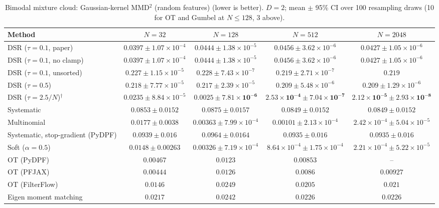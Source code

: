 \begin{table}[H]
\centering
\small
\caption{Bimodal mixture cloud: Gaussian-kernel MMD$^2$ (random features) (lower is better). $D{=}2$; mean $\pm$ 95\% CI over 100 resampling draws (10 for OT and Gumbel at $N\le128$, 3 above).}
\label{tab:static-mixture-rff_mmd2}
\begin{adjustbox}{max width=\linewidth}
\begin{tabular}{lcccc}
\toprule
Method & $N{=}32$ & $N{=}128$ & $N{=}512$ & $N{=}2048$ \\
\midrule
DSR ($\tau{=}0.1$, paper) & $0.0397\pm1.07\times10^{-4}$ & $0.0444\pm1.38\times10^{-5}$ & $0.0456\pm3.62\times10^{-6}$ & $0.0427\pm1.05\times10^{-6}$ \\
DSR ($\tau{=}0.1$, no clamp) & $0.0397\pm1.07\times10^{-4}$ & $0.0444\pm1.38\times10^{-5}$ & $0.0456\pm3.62\times10^{-6}$ & $0.0427\pm1.05\times10^{-6}$ \\
DSR ($\tau{=}0.1$, unsorted) & $0.227\pm1.15\times10^{-5}$ & $0.228\pm7.43\times10^{-7}$ & $0.219\pm2.71\times10^{-7}$ & $0.219$ \\
DSR ($\tau{=}0.5$) & $0.218\pm7.77\times10^{-5}$ & $0.217\pm2.39\times10^{-5}$ & $0.209\pm5.48\times10^{-6}$ & $0.209\pm1.29\times10^{-6}$ \\
DSR ($\tau{=}2.5/N$)$^\dagger$ & $0.0235\pm8.84\times10^{-5}$ & $\mathbf{0.0025\pm7.81\times10^{-6}}$ & $\mathbf{2.53\times10^{-4}\pm7.04\times10^{-7}}$ & $\mathbf{2.12\times10^{-5}\pm2.93\times10^{-8}}$ \\
\midrule
Systematic & $0.0853\pm0.0152$ & $0.0875\pm0.0157$ & $0.0849\pm0.0152$ & $0.0849\pm0.0152$ \\
Multinomial & $0.0177\pm0.0038$ & $0.00363\pm7.99\times10^{-4}$ & $0.00101\pm2.13\times10^{-4}$ & $2.42\times10^{-4}\pm5.04\times10^{-5}$ \\
Systematic, stop-gradient (PyDPF) & $0.0939\pm0.016$ & $0.0964\pm0.0164$ & $0.0935\pm0.016$ & $0.0935\pm0.016$ \\
Soft ($\alpha{=}0.5$) & $0.0148\pm0.00263$ & $0.00326\pm7.19\times10^{-4}$ & $8.64\times10^{-4}\pm1.75\times10^{-4}$ & $2.21\times10^{-4}\pm5.22\times10^{-5}$ \\
OT (PyDPF) & $0.00467$ & $0.0123$ & $0.00853$ & -- \\
OT (PFJAX) & $\mathbf{0.00444}$ & $0.0126$ & $0.0086$ & $0.00927$ \\
OT (FilterFlow) & $0.0146$ & $0.0249$ & $0.0205$ & $0.021$ \\
Eigen moment matching & $0.0217$ & $0.0242$ & $0.0226$ & $0.0226$ \\

\end{tabular}
\end{adjustbox}
\end{table}
